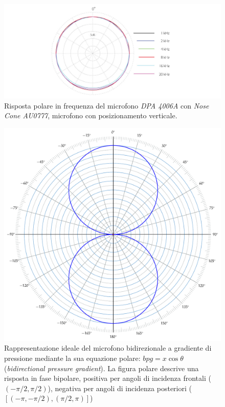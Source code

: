 \begin{figure}[h]
\centering
\includegraphics[width=0.99\columnwidth]{CAPITOLI/1000/IMG/4006A-ddicate-4006A-Omni-Microphone-polar-pattern-nose-cone-veritical.jpg}
\caption{Risposta polare in frequenza del microfono \emph{DPA 4006A} con \emph{Nose Cone AU0777}, microfono con posizionamento verticale.}%
\label{pol:dpa4006nose}
\end{figure}

\begin{figure}[t]
\centering
\includegraphics[width=0.99\columnwidth]{CAPITOLI/_TIKZ/POLAR/fig8}
\caption{Rappresentazione ideale del microfono bidirezionale a gradiente di
pressione mediante la sua equazione polare: $bpg = x\cos\theta$
(\emph{bidirectional pressure gradient}). La figura polare descrive una risposta
in fase bipolare, positiva per angoli di incidenza frontali ($(-\pi/2,\pi/2)$),
negativa per angoli di incidenza posteriori ($[(-\pi,-\pi/2),(\pi/2,\pi)]$)}
\label{polar:fig8}
\end{figure}

